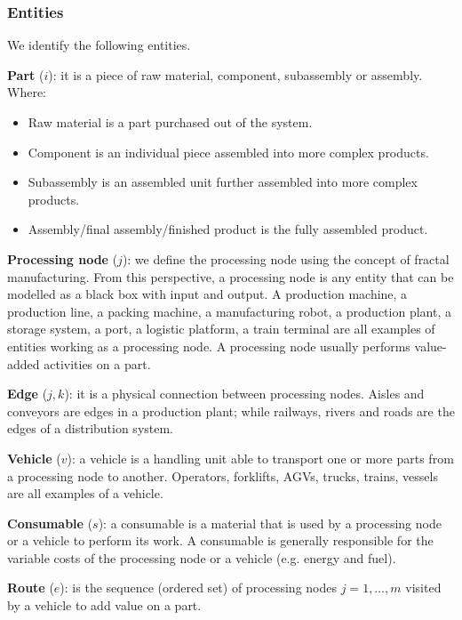 \subsubsection{Entities}
We identify the following entities.\par
\textbf{Part} ($i$): it is a piece of raw material, component, subassembly or assembly. Where:
\begin{itemize}
    \item Raw material is a part purchased out of the system.
    \item Component is an individual piece assembled into more complex products.
    \item Subassembly is an assembled unit further assembled into more complex products.
    \item Assembly/final assembly/finished product is the fully assembled product.
\end{itemize}
\par
\textbf{Processing node} ($j$): we define the processing node using the concept of fractal manufacturing. From this perspective, a processing node is any entity that can be modelled as a black box with input and output. A production machine, a production line, a packing machine, a manufacturing robot, a production plant, a storage system, a port, a logistic platform, a train terminal are all examples of entities working as a processing node. A processing node usually performs value-added activities on a part. \par

\textbf{Edge} ($j,k$): it is a physical connection between processing nodes. Aisles and conveyors are edges in a production plant; while railways, rivers and roads are the edges of a distribution system.\par

\textbf{Vehicle} ($v$): a vehicle is a handling unit able to transport one or more parts from a processing node to another. Operators, forklifts, AGVs, trucks, trains, vessels are all examples of a vehicle. \par

\textbf{Consumable} ($s$): a consumable is a material that is used by a processing node or a vehicle to perform its work. A consumable is generally responsible for the variable costs of the processing node or a vehicle (e.g. energy and fuel).\par

\textbf{Route} ($e$): is the sequence (ordered set) of processing nodes $j=1,\ldots,m$ visited by a vehicle to add value on a part.\par

